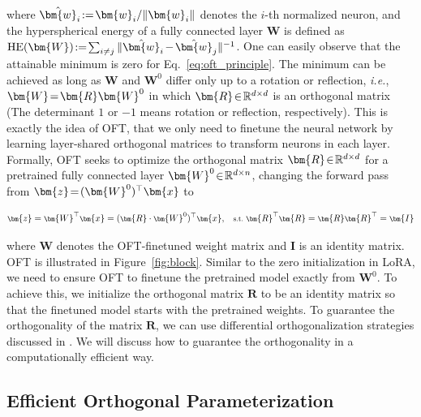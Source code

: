 where $\thickmuskip=2mu \medmuskip=2mu \hat{\bm{w}}_i:=\bm{w}_i/\|\bm{w}_i\|$ denotes the $i$-th normalized neuron, and the hyperspherical energy of a fully connected layer $\bm{W}$ is defined as $\thickmuskip=2mu \medmuskip=2mu \text{HE}(\bm{W}):= \sum_{i\neq j} \|\hat{\bm{w}}_i-\hat{\bm{w}}_j\|^{-1}$. One can easily observe that the attainable minimum is zero for Eq.~\eqref{eq:oft_principle}. The minimum can be achieved as long as $\bm{W}$ and $\bm{W}^0$ differ only up to a rotation or reflection, \emph{i.e.}, $\thickmuskip=2mu \medmuskip=2mu \bm{W}=\bm{R}\bm{W}^0$ in which $\thickmuskip=2mu \medmuskip=2mu \bm{R}\in\mathbb{R}^{d\times d}$ is an orthogonal matrix (The determinant $1$ or $-1$ means rotation or reflection, respectively). This is exactly the idea of OFT, that we only need to finetune the neural network by learning layer-shared orthogonal matrices to transform neurons in each layer. Formally, OFT seeks to optimize the orthogonal matrix $\thickmuskip=2mu \medmuskip=2mu \bm{R}\in\mathbb{R}^{d \times d}$ for a pretrained fully connected layer $\thickmuskip=2mu \medmuskip=2mu\bm{W}^0\in\mathbb{R}^{d\times n}$, changing the forward pass from $\thickmuskip=2mu \medmuskip=2mu\bm{z}=(\bm{W}^0)^\top\bm{x}$ to

\begin{equation}\label{eq:oft_general}
    \footnotesize
    \bm{z}=\bm{W}^\top\bm{x}=(\bm{R}\cdot\bm{W}^0)^\top\bm{x},~~~\text{s.t.}~\bm{R}^\top\bm{R}=\bm{R}\bm{R}^\top=\bm{I}
\end{equation}

where $\bm{W}$ denotes the OFT-finetuned weight matrix and $\bm{I}$ is an identity matrix. OFT is illustrated in Figure~\ref{fig:block}. Similar to the zero initialization in LoRA, we need to ensure OFT to finetune the pretrained model exactly from $\bm{W}^0$. To achieve this, we initialize the orthogonal matrix $\bm{R}$ to be an identity matrix so that the finetuned model starts with the pretrained weights. To guarantee the orthogonality of the matrix $\bm{R}$, we can use differential orthogonalization strategies discussed in \cite{liu2021orthogonal,lezcano2019cheap}. We will discuss how to guarantee the orthogonality in a computationally efficient way.

\subsection{Efficient Orthogonal Parameterization}\label{sect:eff_ortho}

